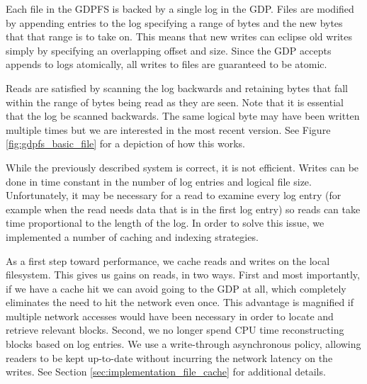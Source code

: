 \documentclass{acm_proc_article-sp}
\begin{document}
Each file in the GDPFS is backed by a single log in the GDP. Files are modified by appending entries to the log specifying a range of bytes and the new bytes that that range is to take on. This means that new writes can eclipse old writes simply by specifying an overlapping offset and size. Since the GDP accepts appends to logs atomically, all writes to files are guaranteed to be atomic.

Reads are satisfied by scanning the log backwards and retaining bytes that fall within the range of bytes being read as they are seen. Note that it is essential that the log be scanned backwards. The same logical byte may have been written multiple times but we are interested in the most recent version. See Figure \ref{fig:gdpfs_basic_file} for a depiction of how this works.

While the previously described system is correct, it is not efficient. Writes can be done in time constant in the number of log entries and logical file size. Unfortunately, it may be necessary for a read to examine every log entry (for example when the read needs data that is in the first log entry) so reads can take time proportional to the length of the log. In order to solve this issue, we implemented a number of caching and indexing strategies.

As a first step toward performance, we cache reads and writes on the local filesystem. This gives us gains on reads, in two ways. First and most importantly, if we have a cache hit we can avoid going to the GDP at all, which completely eliminates the need to hit the network even once. This advantage is magnified if multiple network accesses would have been necessary in order to locate and retrieve relevant blocks. Second, we no longer spend CPU time reconstructing blocks based on log entries. We use a write-through asynchronous policy, allowing readers to be kept up-to-date without incurring the network latency on the writes. See Section \ref{sec:implementation_file_cache} for additional details.
\end{document}
